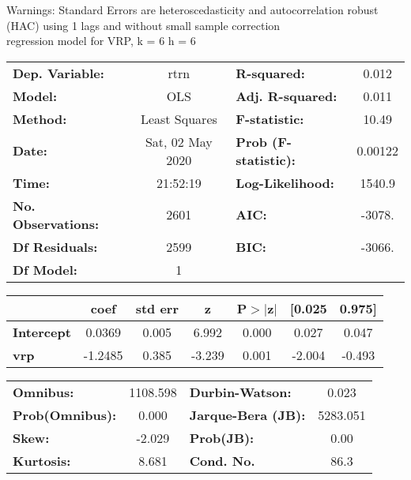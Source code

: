 Warnings: \newline
 [1] Standard Errors are heteroscedasticity and autocorrelation robust (HAC) using 1 lags and without small sample correction\\ 

regression model for VRP, k = 6 h = 6\begin{center}
\begin{tabular}{lclc}
\toprule
\textbf{Dep. Variable:}    &       rtrn       & \textbf{  R-squared:         } &     0.012   \\
\textbf{Model:}            &       OLS        & \textbf{  Adj. R-squared:    } &     0.011   \\
\textbf{Method:}           &  Least Squares   & \textbf{  F-statistic:       } &     10.49   \\
\textbf{Date:}             & Sat, 02 May 2020 & \textbf{  Prob (F-statistic):} &  0.00122    \\
\textbf{Time:}             &     21:52:19     & \textbf{  Log-Likelihood:    } &    1540.9   \\
\textbf{No. Observations:} &        2601      & \textbf{  AIC:               } &    -3078.   \\
\textbf{Df Residuals:}     &        2599      & \textbf{  BIC:               } &    -3066.   \\
\textbf{Df Model:}         &           1      & \textbf{                     } &             \\
\bottomrule
\end{tabular}
\begin{tabular}{lcccccc}
                   & \textbf{coef} & \textbf{std err} & \textbf{z} & \textbf{P$> |$z$|$} & \textbf{[0.025} & \textbf{0.975]}  \\
\midrule
\textbf{Intercept} &       0.0369  &        0.005     &     6.992  &         0.000        &        0.027    &        0.047     \\
\textbf{vrp}       &      -1.2485  &        0.385     &    -3.239  &         0.001        &       -2.004    &       -0.493     \\
\bottomrule
\end{tabular}
\begin{tabular}{lclc}
\textbf{Omnibus:}       & 1108.598 & \textbf{  Durbin-Watson:     } &    0.023  \\
\textbf{Prob(Omnibus):} &   0.000  & \textbf{  Jarque-Bera (JB):  } & 5283.051  \\
\textbf{Skew:}          &  -2.029  & \textbf{  Prob(JB):          } &     0.00  \\
\textbf{Kurtosis:}      &   8.681  & \textbf{  Cond. No.          } &     86.3  \\
\bottomrule
\end{tabular}
\end{center}

